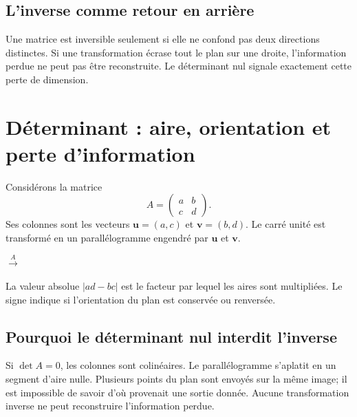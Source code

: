 \documentclass[12pt,a4paper,openany]{book}
\begin{document}
\subsection{L'inverse comme retour en arrière}
Une matrice est inversible seulement si elle ne confond pas deux directions distinctes. Si une transformation écrase tout le plan sur une droite, l'information perdue ne peut pas être reconstruite. Le déterminant nul signale exactement cette perte de dimension.


\section{Déterminant : aire, orientation et perte d'information}

Considérons la matrice
\[
A=\begin{pmatrix}a&b\\c&d\end{pmatrix}.
\]
Ses colonnes sont les vecteurs $\mathbf u=(a,c)$ et $\mathbf v=(b,d)$. Le carré unité est transformé en un parallélogramme engendré par $\mathbf u$ et $\mathbf v$.

\begin{center}
\quad $\xrightarrow{A}$ \quad
{}
\end{center}

La valeur absolue $|ad-bc|$ est le facteur par lequel les aires sont multipliées. Le signe indique si l'orientation du plan est conservée ou renversée.

\subsection{Pourquoi le déterminant nul interdit l'inverse}
Si $\det A=0$, les colonnes sont colinéaires. Le parallélogramme s'aplatit en un segment d'aire nulle. Plusieurs points du plan sont envoyés sur la même image; il est impossible de savoir d'où provenait une sortie donnée. Aucune transformation inverse ne peut reconstruire l'information perdue.
\end{document}

